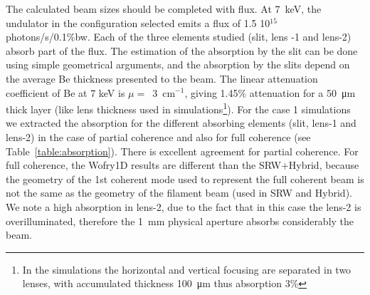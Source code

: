 \documentclass{iucr}              %
\begin{document}
The calculated beam sizes should be completed with flux. At \SI{7}{keV}, the undulator in the configuration selected emits a flux of 1.5 10$^{15}$ photons/s/0.1\%bw. Each of the three elements studied (slit, lens -1 and lens-2) absorb part of the flux. The estimation of the absorption by the slit can be done using simple geometrical arguments, and the absorption by the slits depend on the average Be thickness presented to the beam. The linear attenuation coefficient of Be at 7 keV is $\mu=$~\SI{3}{\centi\meter}$^{-1}$, giving 1.45\% attenuation for a \SI{50}{\micro\meter} thick layer (like lens thickness used in simulations\footnote{In the simulations the horizontal and vertical focusing are separated in two lenses, with accumulated thickness \SI{100}{\micro\meter} thus absorption 3\%}). For the case 1 simulations we extracted the absorption for the different absorbing elements (slit, lens-1 and lens-2) in the case of partial coherence and also for full coherence (see Table~\ref{table:absorption}).
There is excellent agreement for partial coherence. For full coherence, the Wofry1D results are different than the SRW+Hybrid, because the geometry of the 1st coherent mode used to represent the full coherent beam is not the same as the geometry of the filament beam (used in SRW and Hybrid). We note a high absorption in lens-2, due to the fact that in this case the lens-2 is overilluminated, therefore the \SI{1}{\milli\meter} physical aperture absorbs considerably the beam.
\end{document}
